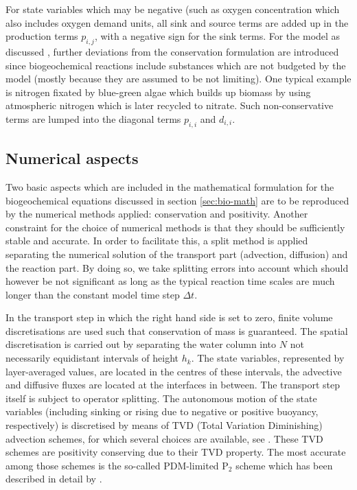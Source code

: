 For state variables which may
be negative (such as oxygen concentration
which also includes oxygen demand units,
all sink and source
terms are added up in the production terms
$p_{i,j}$, with a negative sign for the sink terms.
For the \cite{Neumannetal2002} model as discussed 
\cite{Burchardetal05},
further deviations from the conservation formulation are introduced since
biogeochemical reactions include substances which are not budgeted by the
model (mostly because they are assumed to be not limiting).
One typical example is nitrogen fixated by blue-green algae which
builds up biomass by using atmospheric nitrogen which is later recycled to
nitrate. Such non-conservative terms are lumped into the diagonal terms
$p_{i,i}$ and $d_{i,i}$.

\subsection{Numerical aspects}\label{sec:bio-num}

Two basic aspects which are included in the mathematical formulation for
the biogeochemical equations discussed in section \ref{sec:bio-math}
are to be reproduced by the numerical methods applied: conservation and
positivity. Another constraint for the choice
of numerical methods is that they should be sufficiently stable and accurate.
In order to facilitate this, a split method is applied
separating the numerical solution of the transport part
(advection, diffusion) and the reaction part.
By doing so, we take splitting errors into account which should however
be not significant as long as the typical reaction time scales are
much longer than the constant model time step $\Delta t$.

In the transport step
in which the right hand side is set to zero,
finite volume discretisations
are used such that conservation of mass is guaranteed.
The spatial discretisation is carried out by separating the water column
into $N$ not necessarily equidistant intervals of height $h_k$.
The state variables, represented by layer-averaged values,
are located in the centres of these intervals, the advective and diffusive
fluxes are located at the interfaces in between.
The transport step itself is subject to operator splitting.
The autonomous motion of the state variables (including sinking or
rising due to negative or positive buoyancy, respectively)
is discretised by means of
TVD (Total Variation
Diminishing) advection schemes, for which several choices are
available, see \cite{Pietrzak98}.
These TVD schemes are positivity conserving due to their TVD
property.
The most accurate among those
schemes is the so-called
PDM-limited P$_2$ scheme which has been described in detail
by \cite{Leonhard91}.

